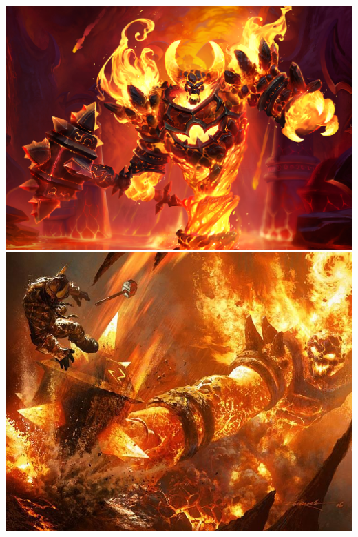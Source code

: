 \begin{center}
	\includegraphics[width=0.515\linewidth]{img/WoW/ragnaros-1920x1200-heroes-of-the-storm-5781.jpg} 	\includegraphics[width=0.45\linewidth]{img/WoW/b9e0808495e9cf3dcbbecedf3e4d5e32.jpg}
\end{center}

